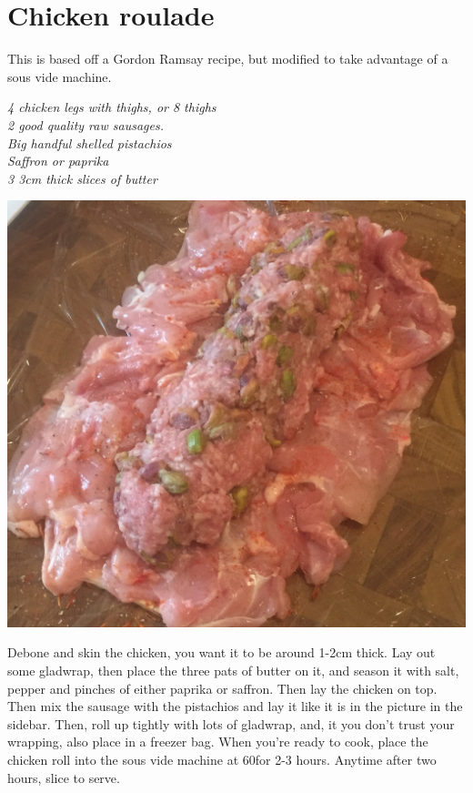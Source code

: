\documentclass{tufte-book}
\begin{document}
\section{Chicken roulade}

This is based off a Gordon Ramsay recipe, but modified to take advantage of a sous vide machine.

\emph{4 chicken legs with thighs, or 8 thighs
\\2 good quality raw sausages.
\\Big handful shelled pistachios
\\Saffron or paprika
\\3 3cm thick slices of butter
}

\begin{marginfigure}%
  \includegraphics[width=\linewidth]{stuffingchicken.jpg}
\end{marginfigure}

Debone and skin the chicken, you want it to be around 1-2cm thick. 
Lay out some gladwrap, then place the three pats of butter on it, and season it with salt, pepper and pinches of either paprika or saffron. Then lay the chicken on top.  
Then mix the sausage with the pistachios and lay it like it is in the picture in the sidebar. Then, roll up tightly with lots of gladwrap, and, it you don't trust your wrapping, also place in a freezer bag.
When you're ready to cook, place the chicken roll into the sous vide machine at 60\celsius   for 2-3 hours. Anytime after two hours, slice to serve.
\end{document}

